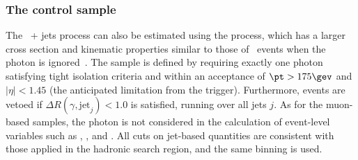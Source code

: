 \subsubsection{The \texorpdfstring{\gj}{photon plus jets} control sample}

The \znunu\ + jets process can also be estimated using the \gj
process, which has a larger cross section and kinematic properties
similar to those of \znunu\ events when the photon is
ignored~\cite{PAS-SUS-08-002,Bern:2011pa}. The \gj sample is defined
by requiring exactly one photon satisfying tight isolation criteria
and within an acceptance of $\pt > 175\gev$ and $|\eta| <
1.45$ (the anticipated limitation from the trigger). Furthermore, events are vetoed if $\Delta
R(\gamma,\textrm{jet}_j) < 1.0$ is satisfied, running over all jets
$j$. As for the muon-based samples, the photon is not considered in
the calculation of event-level variables such as \scalht, \mht, \met and 
\alphat. All cuts on jet-based quantities are consistent with those
applied in the hadronic search region, and the same \HT binning is
used. 

